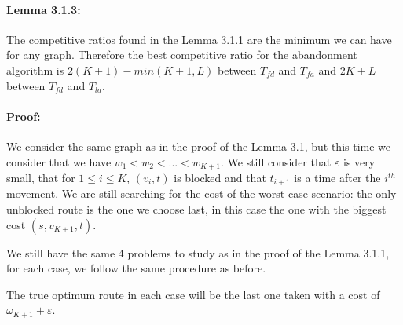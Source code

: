 \documentclass[a4paper, 10pt]{article}
\begin{document}
\paragraph{Lemma 3.1.3:} The competitive ratios found in the Lemma 3.1.1 are the minimum we can have for any graph. Therefore the best competitive ratio for the abandonment algorithm is $2(K+1) - min(K+1,L)$ between $T_{fd}$ and $T_{fa}$ and $2K+L$ between $T_{fd}$ and $T_{la}$.

\paragraph{Proof:} We consider the same graph as in the proof of the Lemma 3.1, but this time we consider that we have $w_1 < w_2 < ... < w_{K+1}$. We still consider that $\varepsilon$ is very small, that for $1\leq i \leq K$, $(v_i,t)$ is blocked and that $t_{i+1}$ is a time after the $i^{th}$ movement. We are still searching for the cost of the worst case scenario: the only unblocked route is the one we choose last, in this case the one with the biggest cost $(s,v_{K+1},t)$.

We still have the same 4 problems to study as in the proof of the Lemma 3.1.1, for each case, we follow the same procedure as before.

The true optimum route in each case will be the last one taken with a cost of $\omega_{K+1} + \varepsilon$.
\end{document}
